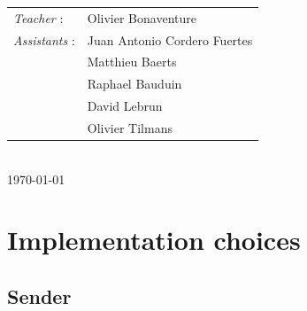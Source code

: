 \documentclass[11pt,a4paper]{article}
\begin{document}
\begin{titlepage}
\normalsize
{\begin{tabular}{ll}
\textit{Teacher} : & Olivier Bonaventure\\
\textit{Assistants} : & Juan Antonio Cordero Fuertes\\
& Matthieu Baerts\\
& Raphael Bauduin\\
& David Lebrun\\
& Olivier Tilmans
\end{tabular}}
\\[1cm]


{\normalsize \today} %

\newpage

\end{titlepage}

%


\section{Implementation choices}

\subsection{Sender}
\end{document}
